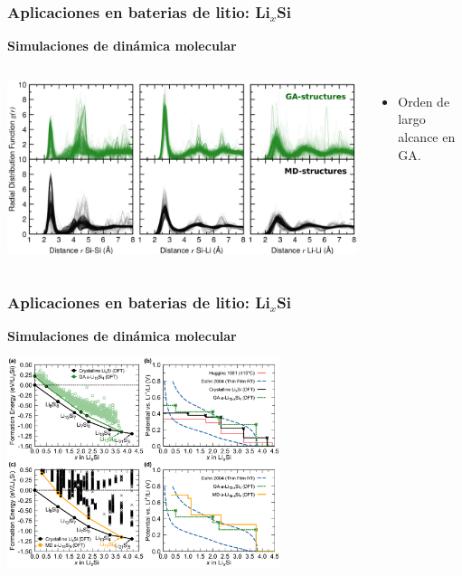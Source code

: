 \documentclass[aspectratio=169]{beamer}
\let\oldtextbf\textbf
\renewcommand{\textbf}[1]{\textcolor{nordblue}{\oldtextbf{#1}}}
\begin{document}
    \begin{frame}
        \frametitle{Aplicaciones en baterias de litio: Li$_x$Si}
        
        \textbf{Simulaciones de dinámica molecular}
        
        \begin{columns}
            \begin{center}
                \includegraphics[width=\columnwidth]{LiSi-rdfs.png}
            \end{center}

            \begin{itemize}
                \item Orden de largo alcance en GA. 
            \end{itemize}
        \end{columns}
            
    \end{frame}
    
    \begin{frame}
        \frametitle{Aplicaciones en baterias de litio: Li$_x$Si}
        
        \textbf{Simulaciones de dinámica molecular}
        
        \begin{center}
            \includegraphics[width=0.6\textwidth]{LiSi-potencial_vs_Li.png}
        \end{center}
            
    \end{frame}
    
\end{document}
